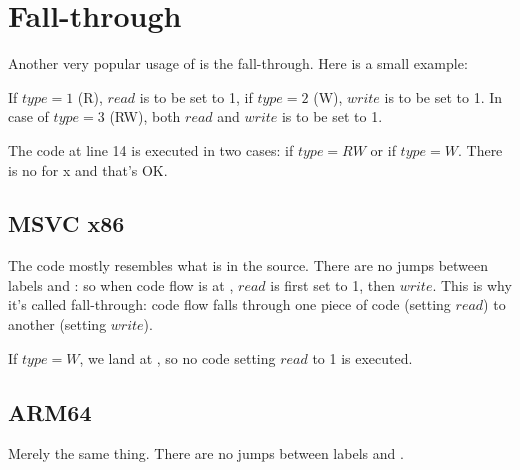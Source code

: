 ﻿\section{Fall-through}

Another very popular usage of  is the fall-through.
Here is a small example:



If $type=1$ (R), $read$ is to be set to 1, if $type=2$ (W), $write$ is to be set to 1.
In case of $type=3$ (RW), both $read$ and $write$ is to be set to 1.

The code at line 14 is executed in two cases: if $type=RW$ or if $type=W$.
There is no  for x and that's OK.

\subsection{MSVC x86}



The code mostly resembles what is in the source.
There are no jumps between labels  and : so when code flow is at 
, $read$ is first set to 1, then $write$.
This is why it's called fall-through: code flow falls through one piece of code
(setting $read$) to another (setting $write$).

If $type=W$, we land at , so no code setting $read$ to 1 is executed.

\subsection{ARM64}



Merely the same thing.
There are no jumps between labels  and .

